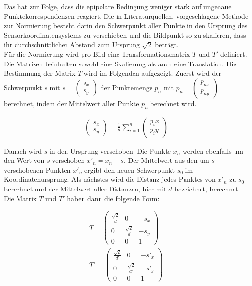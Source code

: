 Das hat zur Folge, dass die epipolare Bedingung  weniger stark auf ungenaue Punktekorrespondenzen reagiert. Die in Literaturquellen, vorgeschlagene Methode zur Normierung besteht darin den Schwerpunkt aller Punkte in den Ursprung des Sensorkoordinatensystems zu verschieben und die Bildpunkt so zu skalieren, dass ihr durchschnittlicher Abstand zum Ursprung $\sqrt{2}$ beträgt\cite{HZ,Ferid,Brooks}.\\


Für die Normierung wird pro Bild eine Transformationsmatrix $T$ und $T'$ definiert. Die Matrizen beinhalten sowohl eine Skalierung als auch eine Translation. Die Bestimmung der Matrix $T$ wird im Folgenden aufgezeigt. Zuerst wird der Schwerpunkt $s$ mit $s=\begin{pmatrix}
s_x\\
s_y
\end{pmatrix}$ der Punktemenge $p_n$ mit $p_n = \begin{pmatrix}
p_{nx}\\
p_{ny}
\end{pmatrix}$ berechnet, indem der Mittelwert aller Punkte $p_n$ berechnet wird.

\begin{gather}
	\begin{pmatrix}
		s_x\\
		s_y
	\end{pmatrix} = \frac{1}{n} \sum_{i = 1}^{n} \begin{pmatrix}
	p_ix\\
	p_iy
\end{pmatrix}
\end{gather}

Danach wird $s$ in den Ursprung verschoben. Die Punkte $x_n$ werden ebenfalls um den Wert von $s$ verschoben $x'_n = x_n - s$. Der Mittelwert aus den um $s$ verschobenen Punkten $x'_n$ ergibt den neuen Schwerpunkt $s_0$ im Koordinatenursprung. Als nächstes wird die Distanz jedes Punktes von $x'_n$ zu $s_0$ berechnet und der Mittelwert aller Distanzen, hier mit $d$ bezeichnet, berechnet. Die Matrix $T$ und $T'$ haben dann die folgende Form:

\begin{gather}
	T = \begin{pmatrix}
		\frac{\sqrt{2}}{d}&0&-s_x\\
		0&\frac{\sqrt{2}}{d}&-s_y\\
		0&0&1
	\end{pmatrix}\\
	T' = \begin{pmatrix}
	\frac{\sqrt{2}}{d'}&0&-s'_x\\
	0&\frac{\sqrt{2}}{d'}&-s'_y\\
	0&0&1
\end{pmatrix}
\end{gather}

